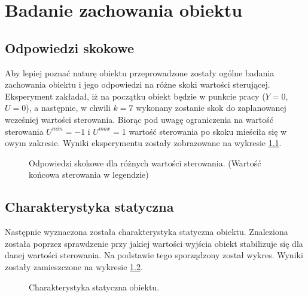 \chapter{Badanie zachowania obiektu}
\label{sec:zad2}
\section{Odpowiedzi skokowe}
Aby lepiej poznać naturę obiektu przeprowadzone zostały ogólne badania
zachowania obiektu i jego odpowiedzi na różne skoki wartości sterującej.
Eksperyment zakładał, iż na początku obiekt będzie w punkcie pracy
($Y = 0$, $U = 0$), a następnie, w chwili $k = 7$ wykonany zostanie skok do zaplanowanej wcześniej wartości sterowania. Biorąc pod uwagę ograniczenia na wartość sterowania $U^{min} = -1$ i $U^{max} = 1$ wartość sterowania
po skoku mieściła się w owym zakresie. Wyniki eksperymentu zostały zobrazowane
na wykresie \ref{fig:skoki}.


\begin{figure}[tb]
\centering
{}
\caption{Odpowiedzi skokowe dla różnych wartości sterowania.
(Wartość końcowa sterowania w legendzie)}
\label{fig:skoki}
\end{figure}

\section{Charakterystyka statyczna}
Następnie wyznaczona została charakterystyka statyczna obiektu. Znaleziona
została poprzez sprawdzenie przy jakiej wartości wyjścia obiekt stabilizuje
się dla danej wartości sterowania. Na podstawie tego sporządzony został wykres.
Wyniki zostały zamieszczone na wykresie \ref{fig:char_stat}.
\begin{figure}[H]
\centering
{}
\caption{Charakterystyka statyczna obiektu.}
\label{fig:char_stat}
\end{figure}

